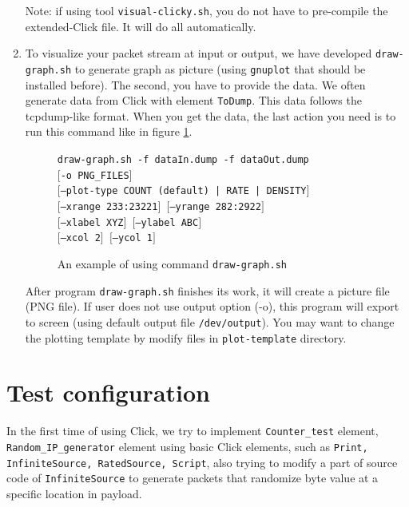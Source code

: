 \documentclass[a4paper]{article}
\begin{document}
\begin{enumerate}
Note: if using tool \texttt{visual-clicky.sh}, you do not have to pre-compile the extended-Click file. It will do all automatically.
        \item To visualize your packet stream at input or output, we have developed \texttt{draw-graph.sh} to generate graph as picture (using \texttt{gnuplot} that should be installed before). The second, you have to provide the data. We often generate data from Click with element \texttt{ToDump}. This data follows the tcpdump-like format. When you get the data, the last action you need is to run this command like in figure \ref{fig:draw-graph}.
        \begin{figure}
\texttt{draw-graph.sh -f dataIn.dump -f dataOut.dump \\
      $[$-o PNG\_FILES$]$\\
      $[$--plot-type COUNT (default) | RATE | DENSITY$]$\\
      $[$--xrange 233:23221$]$  $[$--yrange 282:2922$]$\\
      $[$--xlabel XYZ$]$  $[$--ylabel ABC$]$\\
      $[$--xcol 2$]$  $[$--ycol 1$]$}
      \caption[]{An example of using command \texttt{draw-graph.sh}}
      \label{fig:draw-graph}
      \end{figure} 
  After program \texttt{draw-graph.sh} finishes its work, it will create a picture file (PNG file). If user does not use output option (-o), this program will export to screen (using default output file \texttt{/dev/output}). You may want to change the plotting template by modify files in \texttt{plot-template} directory.
      \end{enumerate}
  \section{Test configuration}
  In the first time of using Click, we try to implement \texttt{Counter\_test} element, \texttt{Random\_IP\_generator} element using basic Click elements, such as \texttt{Print, InfiniteSource, RatedSource, Script}, also trying to modify a part of source code of \texttt{InfiniteSource} to generate packets that randomize byte value at a specific location in payload.
\end{document}
